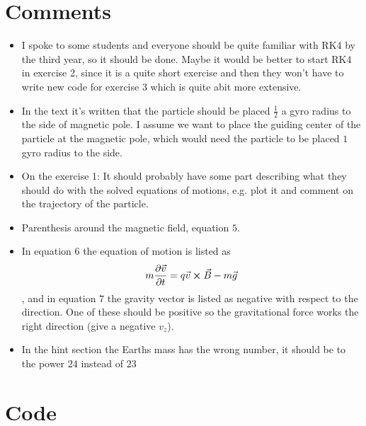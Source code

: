 \documentclass[x11names]{article}
\renewcommand{\va}{\vec}
\begin{document}
\appendix

\section{Comments}
  \begin{itemize}
    \item I spoke to some students and everyone should be quite familiar with RK4 by the third year, so it should be done. Maybe it would be better to start RK4 in exercise 2, since it is a quite short exercise and then they won't have to write new code for exercise 3 which is quite abit more extensive.
    \item In the text it's written that the particle should be placed \(\frac{1}{2}\) a gyro radius to the side of magnetic pole. I assume we want to place the guiding center of the particle at the magnetic pole, which would need the particle to be placed \(1\) gyro radius to the side.
    \item On the exercise 1: It should probably have some part describing what they should do with the solved equations of motions, e.g. plot it and comment on the trajectory of the particle.
    \item Parenthesis around the magnetic field, equation \(5\).
    \item In equation \(6\) the equation of motion is listed as 
    \[m\pdv{\va{v}}{t} = q\va{v} \cross \va{B} - m \va{g}\]
    , and in equation \(7\) the gravity vector is listed as negative with respect to the direction.
    One of these should be positive so the gravitational force works the right direction (give a negative \(v_z\)).
    \item In the hint section the Earths mass has the wrong number, it should be to the power \(24\) instead of \(23\)
  \end{itemize}

\section{Code}
  \label{sec:code}
  
\end{document}
